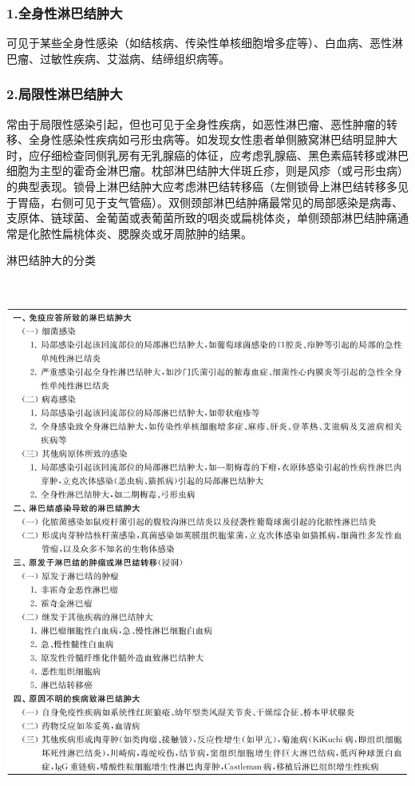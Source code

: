 \subsubsection{1.全身性淋巴结肿大}

可见于某些全身性感染（如结核病、传染性单核细胞增多症等）、白血病、恶性淋巴瘤、过敏性疾病、艾滋病、结缔组织病等。

\subsubsection{2.局限性淋巴结肿大}

常由于局限性感染引起，但也可见于全身性疾病，如恶性淋巴瘤、恶性肿瘤的转移、全身性感染性疾病如弓形虫病等。如发现女性患者单侧腋窝淋巴结明显肿大时，应仔细检查同侧乳房有无乳腺癌的体征，应考虑乳腺癌、黑色素癌转移或淋巴细胞为主型的霍奇金淋巴瘤。枕部淋巴结肿大伴斑丘疹，则是风疹（或弓形虫病）的典型表现。锁骨上淋巴结肿大应考虑淋巴结转移癌（左侧锁骨上淋巴结转移多见于胃癌，右侧可见于支气管癌）。双侧颈部淋巴结肿痛最常见的局部感染是病毒、支原体、链球菌、金葡菌或表葡菌所致的咽炎或扁桃体炎，单侧颈部淋巴结肿痛通常是化脓性扁桃体炎、腮腺炎或牙周脓肿的结果。

\begin{table}[htbp]
\centering
\caption{淋巴结肿大的分类}
\label{tab32-1}
\includegraphics[width=5.86458in,height=6.875in]{./images/Image00161.jpg}
\end{table}

